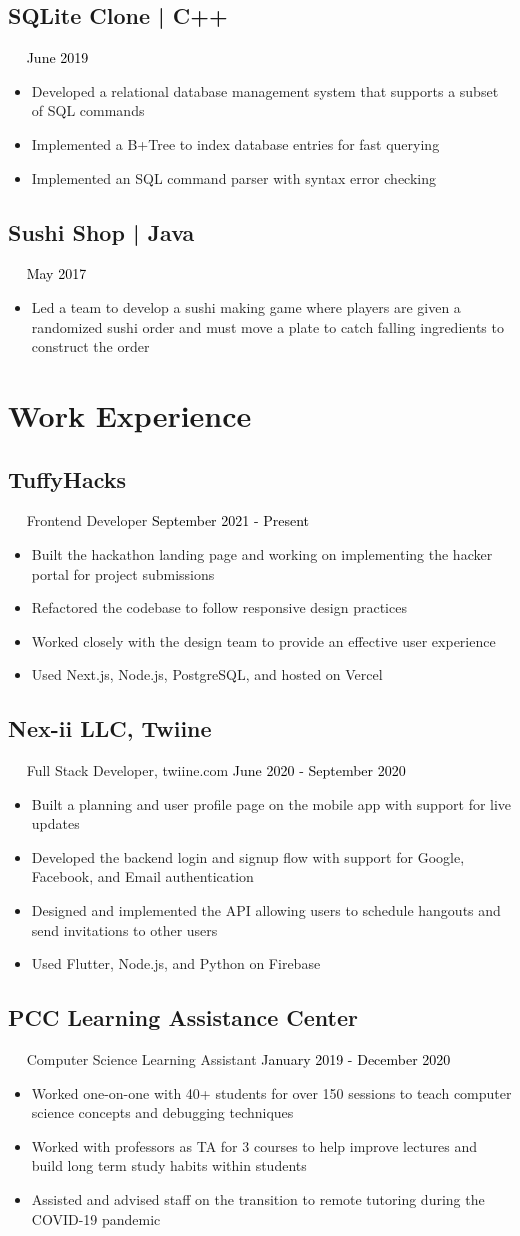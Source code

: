 \documentclass{article}
\newcommand{\resumesection}[3]{
    \subsection*{#1}
    \ 
    \ 
    \small
    \textcolor{csufgrey}{#2}
    \normalsize
    \hfill
    \textcolor{black}{#3}
    \normalsize
}
\begin{document}
\resumesection{SQLite Clone | C++}{}{June 2019}
\begin{itemize}
    \item Developed a relational database management system that supports a subset of SQL commands
    \item Implemented a B+Tree to index database entries for fast querying
    \item Implemented an SQL command parser with syntax error checking
\end{itemize}

\resumesection{Sushi Shop | Java}{}{May 2017}
\begin{itemize}
    \item Led a team to develop a sushi making game where players are given a randomized sushi order and must move a plate to catch falling ingredients to construct the order
\end{itemize}
\hfill
\section*{Work Experience}
\resumesection{TuffyHacks}{Frontend Developer}{September 2021 - Present}
\begin{itemize}
    \item Built the hackathon landing page and working on implementing the hacker portal for project submissions
    \item Refactored the codebase to follow responsive design practices
    \item Worked closely with the design team to provide an effective user experience
    \item Used Next.js, Node.js, PostgreSQL, and hosted on Vercel
\end{itemize}
\resumesection{Nex-ii LLC, Twiine}{Full Stack Developer, twiine.com}{June 2020 - September 2020}
\begin{itemize}
    \item Built a planning and user profile page on the mobile app with support for live updates
    \item Developed the backend login and signup flow with support for Google, Facebook, and Email authentication
    \item Designed and implemented the API allowing users to schedule hangouts and send invitations to other users
    \item Used Flutter, Node.js, and Python on Firebase
\end{itemize}
\resumesection{PCC Learning Assistance Center}{Computer Science Learning Assistant}{January 2019 - December 2020}
\begin{itemize}
    \item Worked one-on-one with 40+ students for over 150 sessions to teach computer science concepts and debugging techniques
    \item Worked with professors as TA for 3 courses to help improve lectures and build long term study habits within students
    \item Assisted and advised staff on the transition to remote tutoring during the COVID-19 pandemic
\end{itemize}
\hfill
\end{document}
